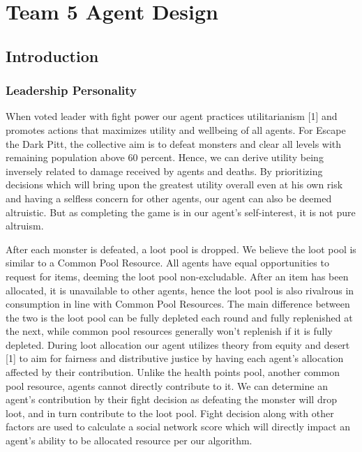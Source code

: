 \useunder{\uline}{\ul}{}
\chapter{Team 5 Agent Design}\label{team_5_agent_design}
\section{Introduction}
\subsection{Leadership Personality}

When voted leader with fight power our agent practices utilitarianism [1] and promotes actions that maximizes utility and wellbeing of all agents. For Escape the Dark Pitt, the collective aim is to defeat monsters and clear all levels with remaining population above 60 percent. Hence, we can derive utility being inversely related to damage received by agents and deaths. By prioritizing decisions which will bring upon the greatest utility overall even at his own risk and having a selfless concern for other agents, our agent can also be deemed altruistic. But as completing the game is in our agent's self-interest, it is not pure altruism.

After each monster is defeated, a loot pool is dropped. We believe the loot pool is similar to a Common Pool Resource. All agents have equal opportunities to request for items, deeming the loot pool non-excludable. After an item has been allocated, it is unavailable to other agents, hence the loot pool is also rivalrous in consumption in line with Common Pool Resources. The main difference between the two is the loot pool can be fully depleted each round and fully replenished at the next, while common pool resources generally won't replenish if it is fully depleted. During loot allocation our agent utilizes theory from equity and desert [1] to aim for fairness and distributive justice by having each agent's allocation affected by their contribution. Unlike the health points pool, another common pool resource, agents cannot directly contribute to it. We can determine an agent's contribution by their fight decision as defeating the monster will drop loot, and in turn contribute to the loot pool. Fight decision along with other factors are used to calculate a social network score which will directly impact an agent's ability to be allocated resource per our algorithm.


